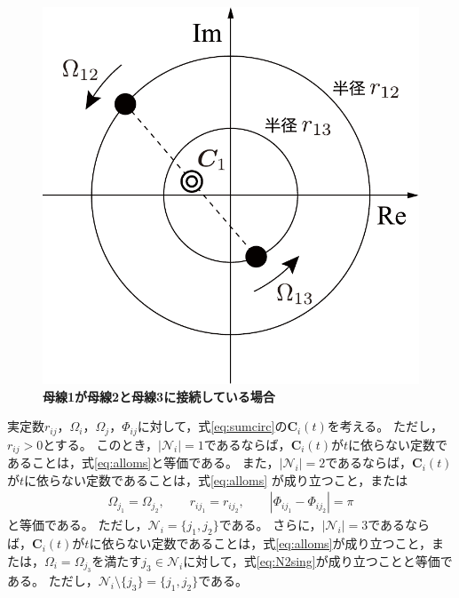 \documentclass[tombow,dvipdfmx]{corona-a5-1.1}
\begin{document}
\begin{figure}[t]
\centering
\includegraphics[width = .4\linewidth]{figs/centerg}
\medskip
\caption{\textbf{母線1が母線2と母線3に接続している場合}}
\label{fig:centerg}
\medskip
\end{figure}


\begin{補題}[電力潮流方程式から導かれる母線の同期]
\label{lem:sumc2}
実定数$r_{ij}$，$\Omega_i$，$\Omega_j$，$\Phi_{ij}$に対して，式\ref{eq:sumcirc}の$\bm{C}_i (t)$を考える。
ただし，$r_{ij}>0$とする。
このとき，$|\mathcal{N}_i|=1$であるならば，$\bm{C}_i (t)$が$t$に依らない定数であることは，式\ref{eq:alloms}と等価である。
また，$|\mathcal{N}_i|=2$であるならば，$\bm{C}_i (t)$が$t$に依らない定数であることは，式\ref{eq:alloms}
が成り立つこと，または
\begin{align}\label{eq:N2sing}
\Omega_{j_1} = \Omega_{j_2}
,\qquad
r_{i j_1} = r_{i j_2}
,\qquad
|\Phi_{i j_1}-\Phi_{i j_2}| = \pi
\end{align}
と等価である。
ただし，$\mathcal{N}_i = \{j_1,j_2\}$である。
さらに，$|\mathcal{N}_i|=3$であるならば，$\bm{C}_i (t)$が$t$に依らない定数であることは，式\ref{eq:alloms}が成り立つこと，または，$\Omega_{i} = \Omega_{j_3}$を満たす$j_3 \in \mathcal{N}_i$に対して，式\ref{eq:N2sing}が成り立つことと等価である。
ただし，$ \mathcal{N}_i \setminus \{j_3\}=\{j_1,j_2\}$である。
\end{補題}
\end{document}
